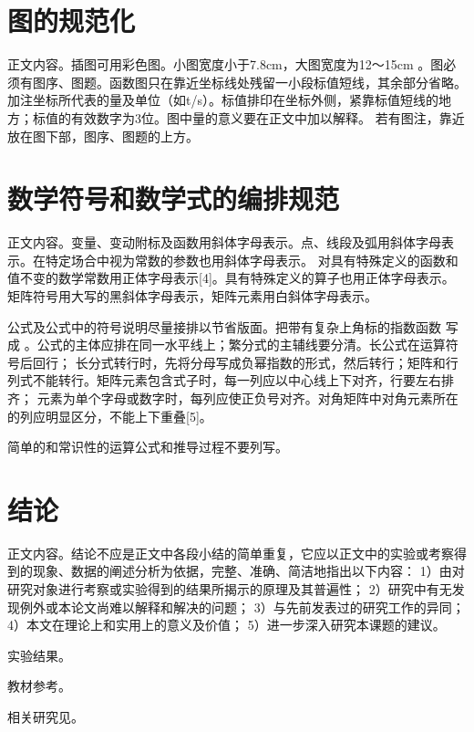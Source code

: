 \documentclass[a4paper, zihao=5, UTF8, AutoFakeBold]{ctexart}
\begin{document}
\section{图的规范化}
正文内容。插图可用彩色图。小图宽度小于7.8cm，大图宽度为12～15cm 。图必须有图序、图题。函数图只在靠近坐标线处残留一小段标值短线，其余部分省略。
加注坐标所代表的量及单位（如t/s）。标值排印在坐标外侧，紧靠标值短线的地方；标值的有效数字为3位。图中量的意义要在正文中加以解释。
若有图注，靠近放在图下部，图序、图题的上方。

\section{数学符号和数学式的编排规范}
正文内容。变量、变动附标及函数用斜体字母表示。点、线段及弧用斜体字母表示。在特定场合中视为常数的参数也用斜体字母表示。
对具有特殊定义的函数和值不变的数学常数用正体字母表示[4]。具有特殊定义的算子也用正体字母表示。矩阵符号用大写的黑斜体字母表示，矩阵元素用白斜体字母表示。\par
公式及公式中的符号说明尽量接排以节省版面。把带有复杂上角标的指数函数 写成 。公式的主体应排在同一水平线上；繁分式的主辅线要分清。长公式在运算符号后回行；
长分式转行时，先将分母写成负幂指数的形式，然后转行；矩阵和行列式不能转行。矩阵元素包含式子时，每一列应以中心线上下对齐，行要左右排齐；
元素为单个字母或数字时，每列应使正负号对齐。对角矩阵中对角元素所在的列应明显区分，不能上下重叠[5]。\par
简单的和常识性的运算公式和推导过程不要列写。\par

\section{结论}
正文内容。结论不应是正文中各段小结的简单重复，它应以正文中的实验或考察得到的现象、数据的阐述分析为依据，完整、准确、简洁地指出以下内容：
1）由对研究对象进行考察或实验得到的结果所揭示的原理及其普遍性；
2）研究中有无发现例外或本论文尚难以解释和解决的问题；
3）与先前发表过的研究工作的异同；
4）本文在理论上和实用上的意义及价值；
5）进一步深入研究本课题的建议。

实验结果\cite{paper1}。

教材参考\cite{book1}。

相关研究见\cite{thesis1}。

\balance  %
\vspace{-6pt}
\printbibliography
[
    heading=bibliography,
    title={参考文献}
]
\end{document}
